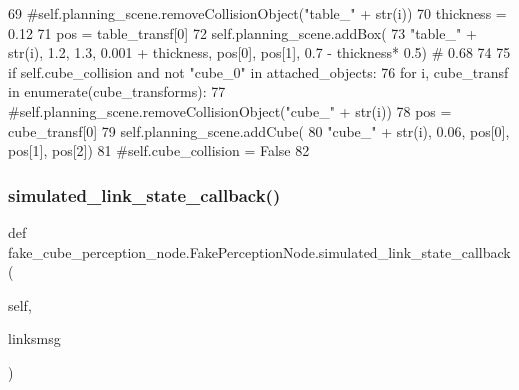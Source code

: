 \begin{DoxyCode}
69                     \textcolor{comment}{#self.planning\_scene.removeCollisionObject("table\_" + str(i))}
70                     thickness = 0.12
71                     pos = table\_transf[0]
72                     self.planning\_scene.addBox(
73                         \textcolor{stringliteral}{"table\_"} + str(i), 1.2, 1.3, 0.001 + thickness, pos[0],  pos[1],  0.7 -  thickness*
      0.5)  \textcolor{comment}{# 0.68}
74 
75             \textcolor{keywordflow}{if} self.cube\_collision \textcolor{keywordflow}{and} \textcolor{keywordflow}{not} \textcolor{stringliteral}{"cube\_0"} \textcolor{keywordflow}{in} attached\_objects:
76                 \textcolor{keywordflow}{for} i, cube\_transf \textcolor{keywordflow}{in} enumerate(cube\_transforms):
77                     \textcolor{comment}{#self.planning\_scene.removeCollisionObject("cube\_" + str(i))}
78                     pos = cube\_transf[0]
79                     self.planning\_scene.addCube(
80                         \textcolor{stringliteral}{"cube\_"} + str(i), 0.06, pos[0],  pos[1],  pos[2])
81                     \textcolor{comment}{#self.cube\_collision = False}
82 
\end{DoxyCode}
\mbox{\label{classfake__cube__perception__node_1_1FakePerceptionNode_ac1127eae8d2eda994b22873529bd198f}} 
\subsubsection{\texorpdfstring{simulated\+\_\+link\+\_\+state\+\_\+callback()}{simulated\_link\_state\_callback()}\hspace{0.1cm}{\footnotesize\ttfamily [2/3]}}
{\footnotesize\ttfamily def fake\+\_\+cube\+\_\+perception\+\_\+node.\+Fake\+Perception\+Node.\+simulated\+\_\+link\+\_\+state\+\_\+callback (\begin{DoxyParamCaption}\item[{}]{self,  }\item[{}]{linksmsg }\end{DoxyParamCaption})}

